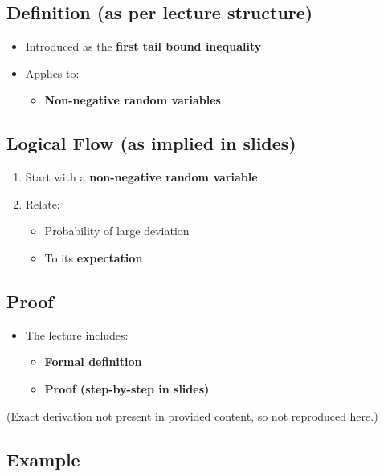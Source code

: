 \documentclass[12pt]{article}
\begin{document}
\subsection*{Definition (as per lecture structure)}

\begin{itemize}
    \item Introduced as the \textbf{first tail bound inequality}
    \item Applies to:
    \begin{itemize}
        \item \textbf{Non-negative random variables}
    \end{itemize}
\end{itemize}

\subsection*{Logical Flow (as implied in slides)}

\begin{enumerate}
    \item Start with a \textbf{non-negative random variable}
    \item Relate:
    \begin{itemize}
        \item Probability of large deviation
        \item To its \textbf{expectation}
    \end{itemize}
\end{enumerate}

\subsection*{Proof}

\begin{itemize}
    \item The lecture includes:
    \begin{itemize}
        \item \textbf{Formal definition}
        \item \textbf{Proof (step-by-step in slides)}
    \end{itemize}
\end{itemize}

\noindent (Exact derivation not present in provided content, so not reproduced here.)

\subsection*{Example}
\end{document}
